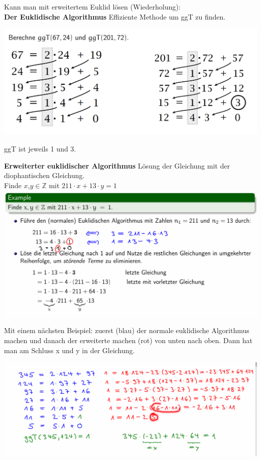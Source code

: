 \documentclass[12pt]{scrartcl}
\begin{document}
Kann man mit erweitertem Euklid lösen (Wiederholung):\\

\textbf{Der Euklidische Algorithmus}
Effiziente Methode um ggT zu finden.

\includegraphics[width=15cm]{img/euqlidic_algorithm.png}

ggT ist jeweils 1 und 3.

\textbf{Erweiterter euklidischer Algorithmus}
Lösung der Gleichung mit der diophantischen Gleichung.\\

Finde $x$,$y \in \mathbb{Z}$ mit $211 \cdot x + 13 \cdot y = 1$\\ 

\includegraphics[width=14cm]{img/erweiterter_euklidischer_algorithmus.png}

Mit einem nächsten Beispiel: zuerst (blau) der normale euklidische Algorithmus machen
und danach der erweiterte machen (rot) von unten nach oben. Dann hat man am Schluss
x und y in der Gleichung.

\includegraphics[width=14cm]{img/erweiterter_euklidischer_algorithmus_beispiel2.png}
\end{document}
